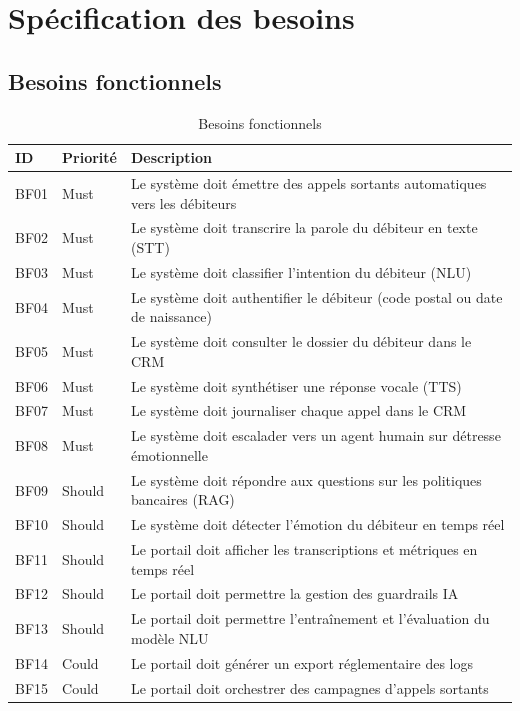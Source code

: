 \section{Spécification des besoins}

\subsection{Besoins fonctionnels}


\begin{table}[H]
  \centering
  \caption{Besoins fonctionnels}
  \label{tab:besoins_fonctionnels}
  \begin{tabularx}{\textwidth}{llX}
    \toprule
    \textbf{ID} & \textbf{Priorité} & \textbf{Description} \\
    \midrule
    BF01 & Must   & Le système doit émettre des appels sortants automatiques vers les débiteurs \\
    BF02 & Must   & Le système doit transcrire la parole du débiteur en texte (STT) \\
    BF03 & Must   & Le système doit classifier l'intention du débiteur (NLU) \\
    BF04 & Must   & Le système doit authentifier le débiteur (code postal ou date de naissance) \\
    BF05 & Must   & Le système doit consulter le dossier du débiteur dans le CRM \\
    BF06 & Must   & Le système doit synthétiser une réponse vocale (TTS) \\
    BF07 & Must   & Le système doit journaliser chaque appel dans le CRM \\
    BF08 & Must   & Le système doit escalader vers un agent humain sur détresse émotionnelle \\
    BF09 & Should & Le système doit répondre aux questions sur les politiques bancaires (RAG) \\
    BF10 & Should & Le système doit détecter l'émotion du débiteur en temps réel \\
    BF11 & Should & Le portail doit afficher les transcriptions et métriques en temps réel \\
    BF12 & Should & Le portail doit permettre la gestion des guardrails IA \\
    BF13 & Should & Le portail doit permettre l'entraînement et l'évaluation du modèle NLU \\
    BF14 & Could  & Le portail doit générer un export réglementaire des logs \\
    BF15 & Could  & Le portail doit orchestrer des campagnes d'appels sortants \\
    \bottomrule
  \end{tabularx}
\end{table}


